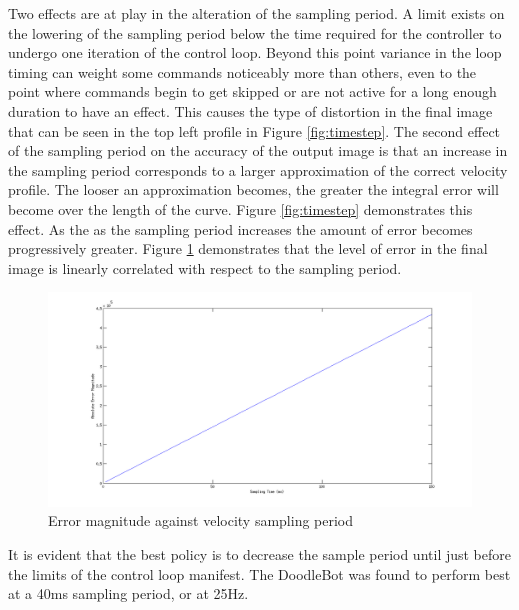 Two effects are at play in the alteration of the sampling period. A limit exists on the lowering of the sampling period below the time required for the controller to undergo one iteration of the control loop. Beyond this point variance in the loop timing can weight some commands noticeably more than others, even to the point where commands begin to get skipped or are not active for a long enough duration to have an effect. This causes the type of distortion in the final image that can be seen in the top left profile in Figure \ref{fig:timestep}. The second effect of the sampling period on the accuracy of the output image is that an increase in the sampling period corresponds to a larger approximation of the correct velocity profile. The looser an approximation becomes, the greater the integral error will become over the length of the curve. Figure \ref{fig:timestep} demonstrates this effect. As the as the sampling period increases the amount of error becomes progressively greater. Figure \ref{fig:tStep} demonstrates that the level of error in the final image is linearly correlated with respect to the sampling period.
\begin{figure}[htbp]  
\includegraphics[width=\textwidth]{figures/performance/tStep.png}
\caption[Plot of error magnitude against velocity sampling period]{Error magnitude against velocity sampling period
\label{fig:tStep}}
\end{figure}  
It is evident that the best policy is to decrease the sample period until just before the limits of the control loop manifest. The DoodleBot was found to perform best at a 40ms sampling period, or at 25Hz.